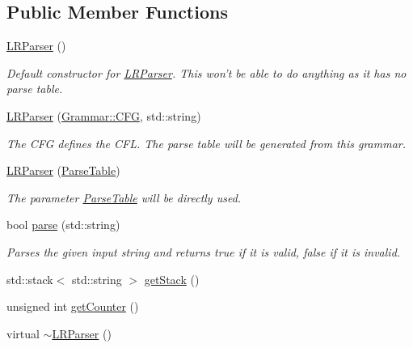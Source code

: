 \subsection*{\-Public \-Member \-Functions}
\begin{DoxyCompactItemize}
\item 
\hyperlink{classparser_1_1LRParser_a47746b2d23e724d5149a51971a92cf7e}{\-L\-R\-Parser} ()
\begin{DoxyCompactList}\small\item\em \-Default constructor for \hyperlink{classparser_1_1LRParser}{\-L\-R\-Parser}. \-This won't be able to do anything as it has no parse table. \end{DoxyCompactList}\item 
\hyperlink{classparser_1_1LRParser_a8eb7c9bcb89383c73da20e01ee60e169}{\-L\-R\-Parser} (\hyperlink{classGrammar_1_1CFG}{\-Grammar\-::\-C\-F\-G}, std\-::string)
\begin{DoxyCompactList}\small\item\em \-The \-C\-F\-G defines the \-C\-F\-L. \-The parse table will be generated from this grammar. \end{DoxyCompactList}\item 
\hyperlink{classparser_1_1LRParser_a14376046af5b5d818b6e46902d765b0d}{\-L\-R\-Parser} (\hyperlink{classparser_1_1ParseTable}{\-Parse\-Table})
\begin{DoxyCompactList}\small\item\em \-The parameter \hyperlink{classparser_1_1ParseTable}{\-Parse\-Table} will be directly used. \end{DoxyCompactList}\item 
bool \hyperlink{classparser_1_1LRParser_ab2152a22b9f4df294863ea2ecb5bea2a}{parse} (std\-::string)
\begin{DoxyCompactList}\small\item\em \-Parses the given input string and returns true if it is valid, false if it is invalid. \end{DoxyCompactList}\item 
std\-::stack$<$ std\-::string $>$ \hyperlink{classparser_1_1LRParser_afb2888c56509ee1b5252e825b48eaf60}{get\-Stack} ()
\item 
unsigned int \hyperlink{classparser_1_1LRParser_a71371a8a7881011135735d46f66aad13}{get\-Counter} ()
\item 
virtual \hyperlink{classparser_1_1LRParser_a786f8c43582c5f620fb6d9f077be2af5}{$\sim$\-L\-R\-Parser} ()
\end{DoxyCompactItemize}
